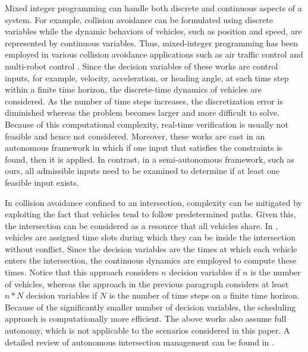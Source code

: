 \documentclass{sig-alternate}
\begin{document}
Mixed integer programming can handle both discrete and continuous aspects of a system. For example, collision avoidance can be formulated using discrete variables while the dynamic behaviors of vehicles, such as position and speed, are represented by continuous variables. Thus, mixed-integer programming has been employed in various collision avoidance applications such as air traffic control \cite{richards_spacecraft_2002,borrelli_milp_2006,christodoulou_automatic_2006} and multi-robot control \cite{earl_modeling_2002,grotli_path_2011}. Since the decision variables of these works are control inputs, for example, velocity, acceleration, or heading angle, at each time step within a finite time horizon, the discrete-time dynamics of vehicles are considered. As the number of time steps increases, the discretization error is diminished whereas the problem becomes larger and more difficult to solve. Because of this computational complexity, real-time verification is usually not feasible and hence not considered. Moreover, these works are cast in an autonomous framework in which if one input that satisfies the constraints is found, then it is applied. In contrast, in a semi-autonomous framework, such as ours, all admissible inputs need to be examined to determine if at least one feasible input exists.

In collision avoidance confined to an intersection, complexity can be mitigated by exploiting the fact that vehicles tend to follow predetermined paths. Given this, the intersection can be considered as a resource that all vehicles share. In \cite{kowshik_provable_2011, lee_development_2012,campos_cooperative_2014}, vehicles are assigned time slots during which they can be inside the intersection without conflict. Since the decision variables are the times at which each vehicle enters the intersection, the continuous dynamics are employed to compute these times. Notice that this approach considers $n$ decision variables if $n$ is the number of vehicles, whereas the approach in the previous paragraph considers at least $n*N$ decision variables if $N$ is the number of time steps on a finite time horizon. Because of the significantly smaller number of decision variables, the scheduling approach is computationally more efficient. The above works also assume full autonomy, which is not applicable to the scenarios considered in this paper. A detailed review of autonomous intersection management can be found in \cite{chen_cooperative_2015}.
\end{document}
